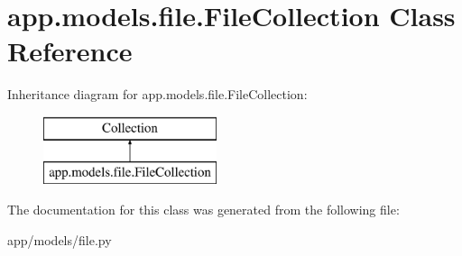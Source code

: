 \hypertarget{classapp_1_1models_1_1file_1_1_file_collection}{}\section{app.\+models.\+file.\+File\+Collection Class Reference}
\label{classapp_1_1models_1_1file_1_1_file_collection}
Inheritance diagram for app.\+models.\+file.\+File\+Collection\+:\begin{figure}[H]
\begin{center}
\leavevmode
\includegraphics[height=2.000000cm]{classapp_1_1models_1_1file_1_1_file_collection}
\end{center}
\end{figure}


The documentation for this class was generated from the following file\+:\begin{DoxyCompactItemize}
\item 
app/models/file.\+py\end{DoxyCompactItemize}
